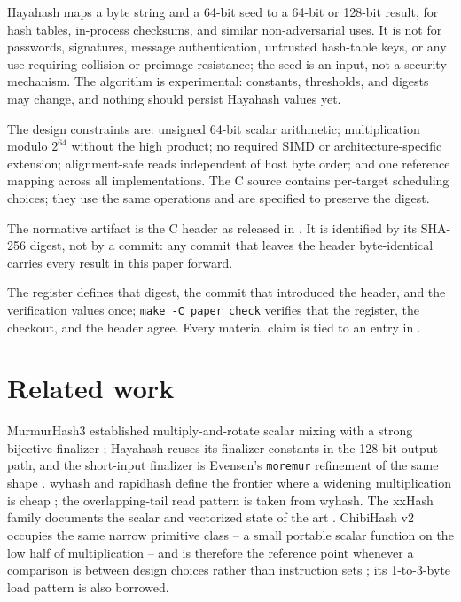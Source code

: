 \documentclass[10pt,a4paper]{article}
\theoremstyle{remark}
\begin{document}
Hayahash maps a byte string and a 64-bit seed to a 64-bit or 128-bit result,
for hash tables, in-process checksums, and similar non-adversarial uses.  It
is not for passwords, signatures, message authentication, untrusted
hash-table keys, or any use requiring collision or preimage resistance; the
seed is an input, not a security mechanism.  The algorithm is experimental:
constants, thresholds, and digests may change, and nothing should persist
Hayahash values yet.

The design constraints are: unsigned 64-bit scalar arithmetic; multiplication
modulo \(2^{64}\) without the high product; no required SIMD or
architecture-specific extension; alignment-safe reads independent of host
byte order; and one reference mapping across all implementations.  The C
source contains per-target scheduling choices; they use the same operations
and are specified to preserve the digest.

The normative artifact is the C header \cite{vesilehto2026hayahash} as
released in \texttt{\SnapshotRelease}.  It is identified by its SHA-256
digest, not by a commit: any commit that leaves the header byte-identical
carries every result in this paper forward.

\begin{center}
\texttt{\SnapshotHeaderSha}
\end{center}

The register  defines that digest, the commit that
introduced the header, and the verification values once; \texttt{make -C
paper check} verifies that the register, the checkout, and the header agree.
Every material claim is tied to an entry in .

\section{Related work}
\label{sec:related}

MurmurHash3 established multiply-and-rotate scalar mixing with a strong
bijective finalizer \cite{appleby2011murmurhash3}; Hayahash reuses its
finalizer constants in the 128-bit output path, and the short-input finalizer
is Evensen's \texttt{moremur} refinement of the same shape
\cite{evensen2018moremur}.  wyhash and rapidhash define the frontier where a
widening multiplication is cheap \cite{wang2021wyhash,nicoshev2025rapidhash};
the overlapping-tail read pattern is taken from wyhash.  The xxHash family
documents the scalar and vectorized state of the art
\cite{collet2023xxhashspec}.  ChibiHash v2 occupies the same narrow primitive
class -- a small portable scalar function on the low half of multiplication
-- and is therefore the reference point whenever a comparison is between
design choices rather than instruction sets \cite{nrk2024chibihash}; its
1-to-3-byte load pattern is also borrowed.
\end{document}
